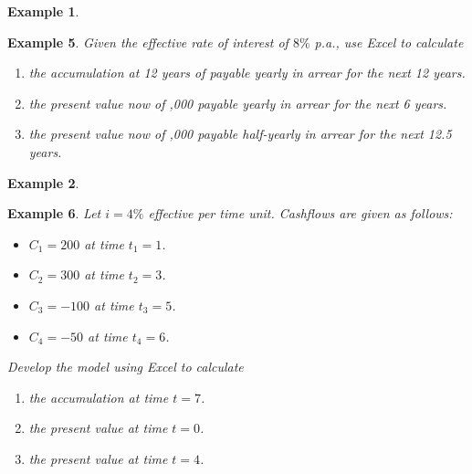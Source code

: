 \documentclass[
]{article}
\theoremstyle{definition}
\theoremstyle{definition}
\newtheorem{example}{Example}[section]
\theoremstyle{definition}
\theoremstyle{definition}
\theoremstyle{remark}
\begin{document}
\begin{example}
\protect\hypertarget{exm:unlabeled-div-7}{}\label{exm:unlabeled-div-7}

\textbf{Example 5}. \emph{Given the effective rate of interest of \(8\%\) p.a., use
Excel to calculate}

\begin{enumerate}
\def\labelenumi{\arabic{enumi}.}
\item
  \emph{the accumulation at 12 years of payable yearly in arrear for the
  next 12 years.}
\item
  \emph{the present value now of ,000 payable yearly in arrear for the next
  6 years.}
\item
  \emph{the present value now of ,000 payable half-yearly in arrear for the
  next 12.5 years.}
\end{enumerate}

\end{example}

\begin{example}
\protect\hypertarget{exm:unlabeled-div-8}{}\label{exm:unlabeled-div-8}

\textbf{Example 6}. \emph{Let \(i = 4\%\) effective per time unit. Cashflows are
given as follows:}

\begin{itemize}
\item
  \emph{\(C_1 = 200\) at time \(t_1 = 1\).}
\item
  \emph{\(C_2 = 300\) at time \(t_2 = 3\).}
\item
  \emph{\(C_3 = -100\) at time \(t_3 = 5\).}
\item
  \emph{\(C_4 = -50\) at time \(t_4 = 6\).}
\end{itemize}

\emph{Develop the model using Excel to calculate}

\begin{enumerate}
\def\labelenumi{\arabic{enumi}.}
\item
  \emph{the accumulation at time \(t = 7\).}
\item
  \emph{the present value at time \(t = 0\).}
\item
  \emph{the present value at time \(t = 4\).}
\end{enumerate}

\end{example}
\end{document}
